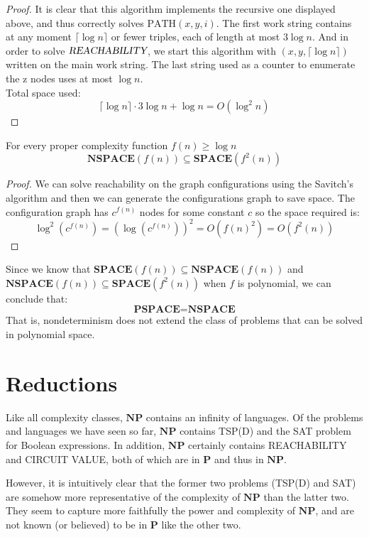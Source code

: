 \documentclass[12pt]{article}
\begin{document}
\begin{proof}
It is clear that this algorithm implements the recursive one displayed above, and thus correctly solves $\mathrm{PATH}(x, y, i)$. The first work string contains at any moment $\lceil \log n \rceil$ or fewer triples, each of length at most $3 \log n$. And in order to solve $\textsl{REACHABILITY}$, we start this algorithm with $(x, y, \lceil \log n \rceil)$ written on the main work string. The last string used as a counter to enumerate the z nodes uses at most $\log n$.\\
Total space used: $$\lceil \log n \rceil\cdot 3\log n+\log n = O(\log^2n)$$
\end{proof}
\begin{defbox}[\textcolor{red}{Corollary}]
  For every proper complexity function $f(n)\ge\log n$
  $$\textbf{NSPACE}(f(n))\subseteq\textbf{SPACE}(f^2(n))$$
\end{defbox}
\begin{proof}
  We can solve reachability on the graph configurations using the Savitch's algorithm and then we can generate the configurations graph to save space. The configuration graph has $c^{f(n)}$ nodes for some constant $c$ so the space required is:
  $$\log^2(c^{f(n)})=(\log(c^{f(n)}))^2=O(f(n)^2)=O(f^2(n))$$
\end{proof}
\begin{defbox}[\textcolor{red}{Corollary}]
  Since we know that $\textbf{SPACE}(f(n))\subseteq\textbf{NSPACE}(f(n))$ and $\textbf{NSPACE}(f(n))\subseteq\textbf{SPACE}(f^2(n))$ when $f$ is polynomial, we can conclude that:
  $$\textbf{PSPACE}=\textbf{NSPACE}$$
  That is, nondeterminism does not extend the class of problems that can be solved in polynomial space.
\end{defbox}

\section{Reductions}
Like all complexity classes, $\mathbf{NP}$ contains an infinity of languages. Of the problems and languages we have seen so far, $\mathbf{NP}$ contains \textsc{TSP(D)} and the \textsc{SAT} problem for Boolean expressions. In addition, $\mathbf{NP}$ certainly contains \textsc{REACHABILITY} and \textsc{CIRCUIT VALUE}, both of which are in $\mathbf{P}$ and thus in $\mathbf{NP}$.

However, it is intuitively clear that the former two problems (\textsc{TSP(D)} and \textsc{SAT}) are somehow more representative of the complexity of $\mathbf{NP}$ than the latter two. They seem to capture more faithfully the power and complexity of $\mathbf{NP}$, and are not known (or believed) to be in $\mathbf{P}$ like the other two.
\end{document}
